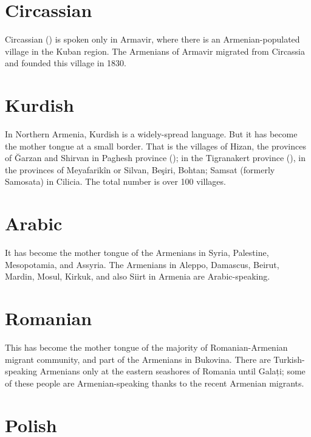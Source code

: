 \begin{adjarianpage}\label{page:33}\end{adjarianpage}%



\section{Circassian}

Circassian () is spoken only in Armavir, where there is an Armenian-populated village in the Kuban region. The Armenians of Armavir migrated from Circassia and founded this village in 1830.



\section{Kurdish}

In   Northern Armenia, Kurdish is a widely-spread language. But it has become the mother tongue at a small border. That is the villages of Hizan, the provinces of Ğarzan and Shirvan in Paghesh province (); in the Tigranakert province (), in the provinces of Meyafarikîn or Silvan, Beşiri, Bohtan; Samsat (formerly Samosata) in Cilicia. The total number is over 100 villages. 

\section{Arabic}\label{sec:Languages:Arabic}

It has become the mother tongue of the Armenians in Syria, Palestine, Mesopotamia, and Assyria. The Armenians in Aleppo, Damascus, Beirut, Mardin, Mosul, Kirkuk, and also Siirt in Armenia are Arabic-speaking. 

\section{Romanian}

This has become the mother tongue of the majority of Romanian-Armenian migrant community, and part of the Armenians in Bukovina. There are Turkish-speaking Armenians only at the eastern seashores of Romania until Galați; some of these people are Armenian-speaking thanks to the recent Armenian migrants. 

\section{Polish}

